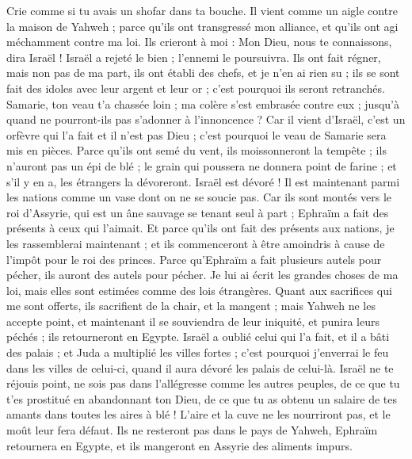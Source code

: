 \begin{multicols}{2}
\VerseOne{}Crie comme si tu avais un shofar dans ta bouche. Il vient comme un aigle contre la maison de Yahweh ; parce qu’ils ont transgressé mon alliance, et qu’ils ont agi méchamment contre ma loi.
Ils crieront à moi : Mon Dieu, nous te connaissons, dira Israël !
Israël a rejeté le bien ; l'ennemi le poursuivra.
Ils ont fait régner, mais non pas de ma part, ils ont établi des chefs, et je n'en ai rien su ; ils se sont fait des idoles avec leur argent et leur or ; c'est pourquoi ils seront retranchés.
Samarie, ton veau t'a chassée loin ; ma colère s'est embrasée contre eux ; jusqu'à quand ne pourront-ils pas s'adonner à l'innoncence ?
Car il vient d'Israël, c'est un orfèvre qui l'a fait et il n'est pas Dieu ; c'est pourquoi le veau de Samarie sera mis en pièces.
Parce qu'ils ont semé du vent, ils moissonneront la tempête ; ils n’auront pas un épi de blé ; le grain qui poussera ne donnera point de farine ; et s'il y en a, les étrangers la dévoreront.
Israël est dévoré ! Il est maintenant parmi les nations comme un vase dont on ne se soucie pas.
Car ils sont montés vers le roi d'Assyrie, qui est un âne sauvage se tenant seul à part ; Ephraïm a fait des présents à ceux qui l'aimait.
Et parce qu'ils ont fait des présents aux nations, je les rassemblerai maintenant ; et ils commenceront à être amoindris à cause de l'impôt pour le roi des princes.
Parce qu'Ephraïm a fait plusieurs autels pour pécher, ils auront des autels pour pécher.
Je lui ai écrit les grandes choses de ma loi, mais elles sont estimées comme des lois étrangères.
Quant aux sacrifices qui me sont offerts, ils sacrifient de la chair, et la mangent ; mais Yahweh ne les accepte point, et maintenant il se souviendra de leur iniquité, et punira leurs péchés ; ils retourneront en Egypte.
Israël a oublié celui qui l'a fait, et il a bâti des palais ; et Juda a multiplié les villes fortes ; c'est pourquoi j'enverrai le feu dans les villes de celui-ci, quand il aura dévoré les palais de celui-là.
\VerseOne{}Israël ne te réjouis point, ne sois pas dans l’allégresse comme les autres peuples, de ce que tu t’es prostitué en abandonnant ton Dieu, de ce que tu as obtenu un salaire de tes amants dans toutes les aires à blé !
L'aire et la cuve ne les nourriront pas, et le moût leur fera défaut.
Ils ne resteront pas dans le pays de Yahweh, Ephraïm retournera en Egypte, et ils mangeront en Assyrie des aliments impurs.

\end{multicols}
